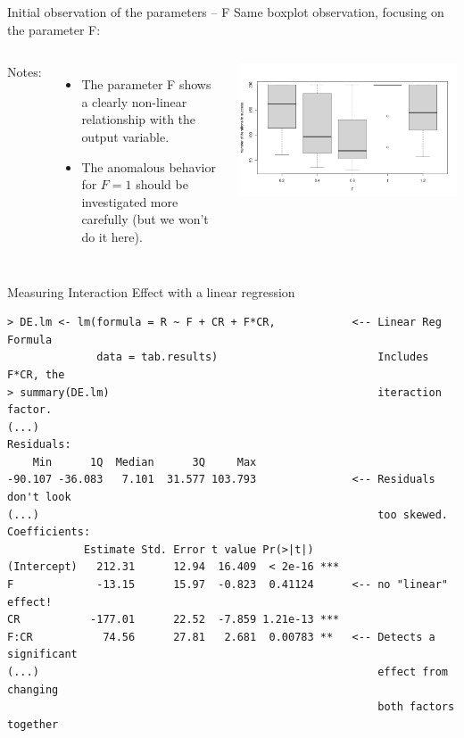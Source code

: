 \begin{frame}[t]{Initial observation of the parameters -- F}{}
  Same boxplot observation, focusing on the parameter F:
  \begin{columns}
    Notes:
    \begin{itemize}
    \item The parameter F shows a clearly non-linear relationship with
      the output variable.\bigskip
      
    \item The anomalous behavior for $F=1$ should be investigated more
      carefully (but we won't do it here).
    \end{itemize}
    \includegraphics[width=\textwidth]{../img/DE_experiment_F_analysis.png}
  \end{columns}
\end{frame}

\begin{frame}[t,fragile]{Measuring Interaction Effect with a linear regression}{}

{\smaller
\begin{verbatim}
> DE.lm <- lm(formula = R ~ F + CR + F*CR,            <-- Linear Reg Formula
              data = tab.results)                         Includes F*CR, the
> summary(DE.lm)                                          iteraction factor.
(...)
Residuals:
    Min      1Q  Median      3Q     Max 
-90.107 -36.083   7.101  31.577 103.793               <-- Residuals don't look
(...)                                                     too skewed.
Coefficients:
            Estimate Std. Error t value Pr(>|t|)    
(Intercept)   212.31      12.94  16.409  < 2e-16 ***  
F             -13.15      15.97  -0.823  0.41124      <-- no "linear" effect!
CR           -177.01      22.52  -7.859 1.21e-13 ***
F:CR           74.56      27.81   2.681  0.00783 **   <-- Detects a significant
(...)                                                     effect from changing
                                                          both factors together
\end{verbatim}}                                                 
\end{frame}

